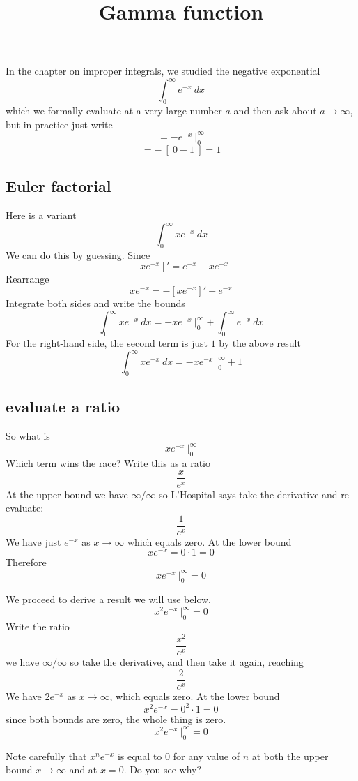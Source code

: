 \documentclass[11pt, oneside]{article}
\title{Gamma function}
\date{}
\begin{document}
\maketitle
\Large

In the chapter on improper integrals, we studied the negative exponential
\[ \int_0^{\infty} e^{-x} \ dx \]
which we formally evaluate at a very large number $a$ and then ask about $a \rightarrow \infty$, but in practice just write
\[ = -e^{-x} \ \bigg |_0^{\infty} \]
\[ = - \ [ \ 0 - 1 \ ] = 1 \]

\subsection*{Euler factorial}

Here is a variant
\[ \int_0^{\infty} x e^{-x} \ dx \]
We can do this by guessing.  Since
\[ [x e^{-x} ]' = e^{-x} - x e^{-x} \]
Rearrange
\[  x e^{-x} = - [x e^{-x} ]' + e^{-x} \]
Integrate both sides and write the bounds
\[ \int_0^{\infty} x e^{-x} \ dx = - x e^{-x} \ \bigg |_0^{\infty} +  \int_0^{\infty} e^{-x} \ dx  \]
For the right-hand side, the second term is just $1$ by the above result
\[ \int_0^{\infty} x e^{-x} \ dx = - x e^{-x} \ \bigg |_0^{\infty} +  1  \]

\subsection*{evaluate a ratio}
So what is
\[ x e^{-x} \ \bigg |_0^{\infty} \]
Which term wins the race?  Write this as a ratio
\[ \frac{x}{e^{x}} \]
At the upper bound we have $\infty/\infty$ so L'Hospital says take the derivative and re-evaluate:
\[ \frac{1}{e^{x}} \]
We have just $e^{-x}$ as $x \rightarrow \infty$ which equals zero.  
At the lower bound
\[ x e^{-x}  = 0 \cdot 1 = 0 \]
Therefore 
\[ x e^{-x} \ \bigg |_0^{\infty} = 0 \]

We proceed to derive a result we will use below.
\[ x^2 e^{-x} \ \bigg |_0^{\infty} = 0 \]
Write the ratio
\[ \frac{x^2}{e^x} \]
we have $\infty/\infty$ so take the derivative, and then take it again, reaching
\[ \frac{2}{e^{x}} \]
We have $2e^{-x}$ as $x \rightarrow \infty$, which equals zero.  
At the lower bound
\[ x^2 e^{-x}  = 0^2 \cdot 1 = 0 \]
since both bounds are zero, the whole thing is zero.
\[ x^2 e^{-x} \ \bigg |_0^{\infty} = 0  \]

Note carefully that $x^n e^{-x}$ is equal to $0$ for any value of $n$ at both the upper bound $x \rightarrow {\infty}$ and at $x = 0$.  Do you see why?
\end{document}

